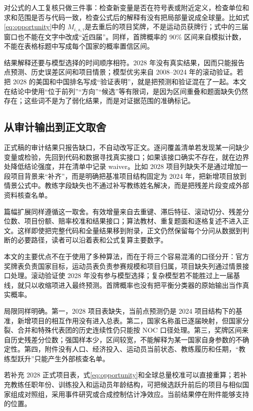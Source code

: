 \documentclass[UTF8,11pt,a4paper]{ctexart}
\begin{document}
对公式的人工复核只做三件事：检查新变量是否在符号表或附近定义，检查单位和求和范围是否与代码一致，检查公式后的解释有没有把局部量说成全球量。比如式\eqref{eq:opportunity}中的 $M_{i,s,\tau}$是去重后的项目奖牌，不是运动员获牌行；式中的三届窗口也不能在文字中改成“近四届”。同样，首牌概率的 90\% 区间来自模拟计数，不能在表格标题中写成每个国家的概率置信区间。

结果解释还要与模型选择的时间顺序相符。2028 年没有真实结果，因而只能报告点预测、历史误差区间和项目情景；模型优劣来自 2008--2024 年的滚动验证。若把 2028 的美国和中国排名写成“验证表明”，就是把预测和验证混在了一起。本文在结论中使用“位于前列”“方向”“候选”等有限词，是因为区间重叠和题面缺失仍然存在；这些词不是为了弱化结果，而是对证据范围的准确标记。

\subsection{从审计输出到正文取舍}

正式稿的审计结果只报告缺口，不自动改写正文。逐问覆盖清单若发现某一问缺少变量或检验，先回到代码和数据寻找真实接口；如果该接口确实不存在，就在边界处降低结论强度，并在清单中记录 waiver。比如 2028 项目列缺失不是通过增加一段项目背景来“补齐”，而是明确把基准项目结构固定为 2024 年，把新增项目放到情景公式中。教练字段缺失也不通过补写教练姓名解决，而是把残差片段变成外部资料核查名单。

篇幅扩展同样遵循这一取舍。有效增量来自去重键、滞后特征、滚动切分、残差分位数、项目份额、赔率校准和结果接口；算法教材、重复题面和逐格复述不进入正文。这样即使把完整代码和全量结果移到附录，正文仍然保留每个分问从数据到判断的必要路径，读者可以沿着表和公式复算主要数字。

本文的主要优点不在于使用了多种算法，而在于将三个容易混淆的口径分开：官方奖牌表负责国家目标，运动员表负责参赛规模和项目归属，项目缺失列通过情景接口处理。滚动验证使 2028 年没有参与模型选择；复杂模型若不能胜过上一届基线，就只以收缩项进入最终预测。首牌概率也没有把平衡分类器的原始输出当作真实概率。

局限同样明确。第一，2028 项目表缺失，当前点预测仍是 2024 项目结构下的基准，新增项目的相互作用没有进入总表。第二，国家名称虽已逐届映射，但国家分裂、合并和特殊代表团的历史连续性仍只能按 NOC 口径处理。第三，奖牌区间来自历史残差分位数；强国样本少，区间较宽，不能解释为某一国家自身参数的不确定性。第四，附件没有人口、经济投入、运动员当前状态、教练履历和任期，“教练型跃升”只能产生外部核查名单。

若补充 2028 正式项目表，式\eqref{eq:opportunity}和全球总量校准可以直接重算；若补充教练任职年份、训练投入和运动员年龄结构，可把候选跃升前后的项目与相似国家组成对照组，采用事件研究或合成控制估计净效应。当前结果停在附件能够支持的位置。
\end{document}
